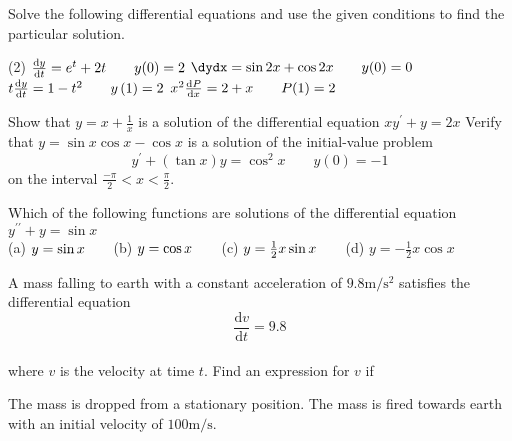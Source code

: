 \begin{Exercise}[title={Differential Equations},label=exDiffEqns]
	\Question Solve the following differential equations and use the given conditions to find the particular solution. 
	\begin{tasks}(2)
	\task $\frac{\mathrm{d}y}{\mathrm{d}t} =e^{t} +2 t\text{\quad \quad }y (0) =2$ %
	\task $\dydx =\sin  2 x +\cos  2 x\text{\quad \quad }y (0) =0$ %
	\task $t \frac{\mathrm{d}y}{\mathrm{d}t} =1 -t^{2}\text{\quad \quad }y \left (1\right ) =2$ %
	\task $x^{2} \frac{\mathrm{d} P}{\mathrm{d} x} =2 +x\text{\quad \quad }P (1) =2$ %
	\end{tasks}

\Question Show that $y =x +\frac{1}{x}$ is a solution of the differential equation $x y^{ \prime } +y =2 x$  %
\Question Verify that $y =\sin  x \cos  x -\cos  x$ is a solution of the initial-value problem
\begin{equation*}y^{ \prime } +\left (\tan  x\right ) y =\cos ^{2} x\qquad y (0) = -1
\end{equation*} on the interval $\frac{ -\pi }{2} <x <\frac{\pi }{2}$. %

\Question Which of the following functions are solutions of the differential
equation $y^{ \prime  \prime } +y =\sin  x$ \\\relax (a)  $y =\sin  x\text{\quad \quad }$(b)  $y =\cos  x\text{\quad \quad }$(c)  $y =\frac{1}{2} x \sin  x\text{\quad \quad }$(d)  $y = -\frac{1}{2} x \cos  x$ %

\Question A mass falling to earth with a constant acceleration of $9.8 \mathrm{m}/\mathrm{s}^{2}$ satisfies the differential equation
\begin{equation*}\frac{\mathrm{d} v}{\mathrm{d} t} =9.8
\end{equation*} \\\relax where $v$ is the velocity at time $t$.  Find an expression for $v$ if 
\begin{tasks}
	\task The mass is dropped from a stationary position. 
	\task The mass is fired towards earth with an initial velocity of $100 \mathrm{m}/\mbox{s}\text{.}$ \end{tasks}


\end{Exercise}
